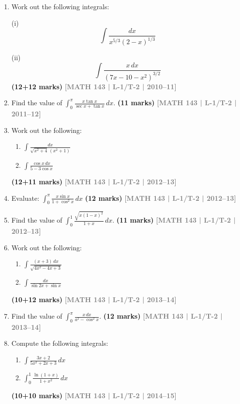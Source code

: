 \documentclass[12pt,a4paper]{article}
\newcommand{\yr}[1]{\hfill\textcolor{gray}{\small\textbf{[#1]}}}
\newcommand{\mk}[1]{\textcolor{orange!70!black}{\small\textbf{(#1 marks)}}}
\begin{document}
\begin{enumerate}

\item  Work out the following integrals:

(i) $$\int \frac{dx}{x^{5/3}(2-x)^{1/3}}$$

(ii) $$\int \frac{x \, dx}{(7x - 10 - x^2)^{3/2}}$$
\mk{12+12} \yr{MATH 143 | L-1/T-2 | 2010--11}

\item Find the value of $\displaystyle\int_{0}^{\pi}\frac{x\tan x}{\sec x+\tan x}\,dx$.
\mk{11\textonehalf} \yr{MATH 143 | L-1/T-2 | 2011--12}

\item Work out the following:
\begin{enumerate}
  \item $\displaystyle\int \frac{dx}{\sqrt{x^{2}+4}\,(x^{2}+1)}$
  \item $\displaystyle\int \frac{\cos x\,dx}{5-3\cos x}$
\end{enumerate}
\mk{12+11} \yr{MATH 143 | L-1/T-2 | 2012--13}

\item Evaluate: $\displaystyle\int_{0}^{\pi}\frac{x\sin x}{1+\cos^{2}x}\,dx$
\mk{12\textonehalf} \yr{MATH 143 | L-1/T-2 | 2012--13}

\item Find the value of $\displaystyle\int_{0}^{1}\frac{\sqrt{x(1-x)^{2}}}{1+x}\,dx$.
\mk{11} \yr{MATH 143 | L-1/T-2 | 2012--13}

\item Work out the following:
\begin{enumerate}
  \item $\displaystyle\int \frac{(x+3)\,dx}{\sqrt{4x^{2}-4x+3}}$
  \item $\displaystyle\int \frac{dx}{\sin 2x + \sin x}$
\end{enumerate}
\mk{10+12} \yr{MATH 143 | L-1/T-2 | 2013--14}

\item Find the value of $\displaystyle\int_{0}^{\pi}\frac{x\,dx}{a^{2}-\cos^{2}x}$.
\mk{12\textonehalf} \yr{MATH 143 | L-1/T-2 | 2013--14}

\item Compute the following integrals:
\begin{enumerate}
  \item $\displaystyle\int \frac{3x+2}{{5x^{2}+2x+3}}\,dx$
  \item $\displaystyle\int_{0}^{1}\frac{\ln(1+x)}{1+x^{2}}\,dx$
\end{enumerate}
\mk{10+10} \yr{MATH 143 | L-1/T-2 | 2014--15}


\end{enumerate}
\end{document}
